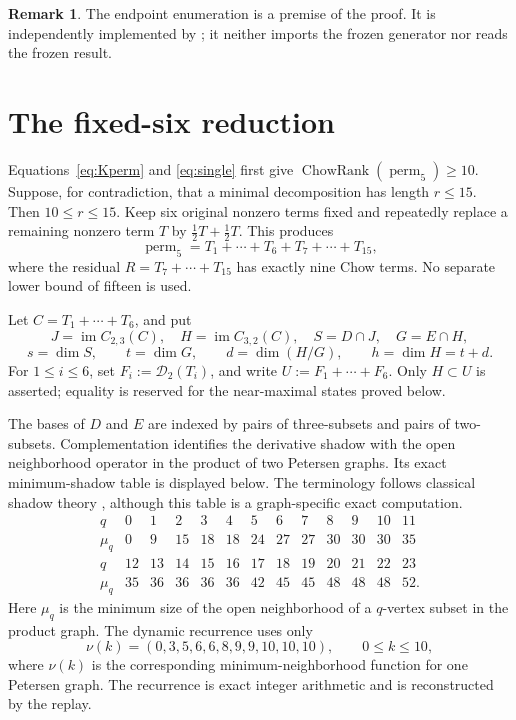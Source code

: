 \documentclass[11pt,reqno]{amsart}
\theoremstyle{definition}
\newtheorem{remark}[theorem]{Remark}
\newcommand{\im}{\operatorname{im}}
\newcommand{\ChowRank}{\operatorname{ChowRank}}
\newcommand{\perm}{\operatorname{perm}}
\newcommand{\cD}{\mathcal D}
\begin{document}
\begin{remark}
The endpoint enumeration is a premise of the proof. It is independently
implemented by
; it neither
imports the frozen generator nor reads the frozen result.
\end{remark}

\section{The fixed-six reduction}\label{sec:fixedsix}

Equations~\eqref{eq:Kperm} and \eqref{eq:single} first give
\(\ChowRank(\perm_5)\ge10\). Suppose, for contradiction, that a minimal
decomposition has length \(r\le15\). Then \(10\le r\le15\). Keep six
original nonzero terms fixed and repeatedly replace a remaining nonzero term
\(T\) by \(\frac12T+\frac12T\). This produces
\[
 \perm_5=T_1+\cdots+T_6+T_7+\cdots+T_{15},
\]
where the residual \(R=T_7+\cdots+T_{15}\) has exactly nine Chow terms. No
separate lower bound of fifteen is used.

Let \(C=T_1+\cdots+T_6\), and put
\[
 J=\im C_{2,3}(C),\quad H=\im C_{3,2}(C),\quad
 S=D\cap J,\quad G=E\cap H,
\]
\[
 s=\dim S,\qquad t=\dim G,\qquad d=\dim(H/G),\qquad h=\dim H=t+d.
\]
For \(1\le i\le6\), set \(F_i:=\cD_2(T_i)\), and write
\(U:=F_1+\cdots+F_6\).
Only \(H\subset U\) is asserted; equality is reserved for the near-maximal
states proved below.

The bases of \(D\) and \(E\) are indexed by pairs of three-subsets and pairs
of two-subsets. Complementation identifies the derivative shadow with the
open neighborhood operator in the product of two Petersen graphs. Its exact
minimum-shadow table is displayed below. The terminology follows classical
shadow theory \cite{Kruskal1963,Katona1968}, although this table is a
graph-specific exact computation.
\begin{equation}\label{eq:shadow}
\begin{array}{c|rrrrrrrrrrrr}
q&0&1&2&3&4&5&6&7&8&9&10&11\\ \hline
\mu_q&0&9&15&18&18&24&27&27&30&30&30&35\\[1mm]
q&12&13&14&15&16&17&18&19&20&21&22&23\\ \hline
\mu_q&35&36&36&36&36&42&45&45&48&48&48&52.
\end{array}
\end{equation}
Here \(\mu_q\) is the minimum size of the open neighborhood of a
\(q\)-vertex subset in the product graph. The dynamic recurrence uses only
\[
 \nu(k)=(0,3,5,6,6,8,9,9,10,10,10),\qquad0\le k\le10,
\]
where \(\nu(k)\) is the corresponding minimum-neighborhood function for one
Petersen graph. The recurrence is exact
integer arithmetic and is reconstructed by the replay.
\end{document}
